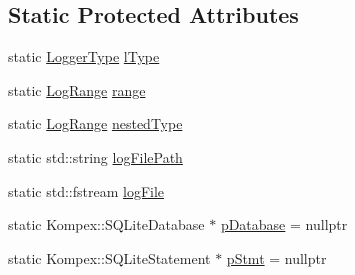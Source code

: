 \subsection*{Static Protected Attributes}
\begin{DoxyCompactItemize}
\item 
static \hyperlink{namespace_osiris_i_1_1_utilities_a77a3086b9443f21343ccbe78d283cbfe}{Logger\-Type} \hyperlink{class_osiris_i_1_1_utilities_1_1_logger_a5243e5e0a3f5750ab0bf7cfba10e61aa}{l\-Type}
\item 
static \hyperlink{namespace_osiris_i_1_1_utilities_a8a7398a763a2e2e8cc657d8b44b95c20}{Log\-Range} \hyperlink{class_osiris_i_1_1_utilities_1_1_logger_a86c1c8c26697c3bca4540ba83cfc48b5}{range}
\item 
static \hyperlink{namespace_osiris_i_1_1_utilities_a8a7398a763a2e2e8cc657d8b44b95c20}{Log\-Range} \hyperlink{class_osiris_i_1_1_utilities_1_1_logger_a8b54c55012509ce94a2973fc7d05f974}{nested\-Type}
\item 
static std\-::string \hyperlink{class_osiris_i_1_1_utilities_1_1_logger_ac4d1dfec2556b697692f25afca30b2f0}{log\-File\-Path}
\item 
static std\-::fstream \hyperlink{class_osiris_i_1_1_utilities_1_1_logger_a7b94ce620e6d19b4168c245b079081e7}{log\-File}
\item 
static Kompex\-::\-S\-Q\-Lite\-Database $\ast$ \hyperlink{class_osiris_i_1_1_utilities_1_1_logger_a06244b9bf8a24622c53d7cbb750a95da}{p\-Database} = nullptr
\item 
static Kompex\-::\-S\-Q\-Lite\-Statement $\ast$ \hyperlink{class_osiris_i_1_1_utilities_1_1_logger_a6d87ea6dd9afbe204cf4856b40240cbd}{p\-Stmt} = nullptr
\end{DoxyCompactItemize}


